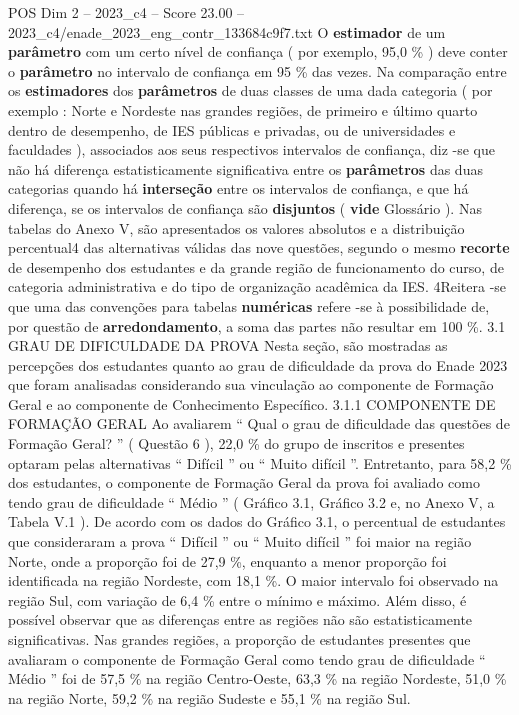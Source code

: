 \begin{textsample}{POS Dim 2 – 2023\_c4 – Score 23.00 – 2023\_c4/enade\_2023\_eng\_contr\_133684c9f7.txt}
O \textbf{estimador} de um \textbf{parâmetro} com um certo nível de confiança ( por exemplo, 95,0 \% ) deve conter o \textbf{parâmetro} no intervalo de confiança em 95 \% das vezes.
Na comparação entre os \textbf{estimadores} dos \textbf{parâmetros} de duas classes de uma dada categoria ( por exemplo : Norte e Nordeste nas grandes regiões, de primeiro e último quarto dentro de desempenho, de IES públicas e privadas, ou de universidades e faculdades ), associados aos seus respectivos intervalos de confiança, diz -se que não há diferença estatisticamente significativa entre os \textbf{parâmetros} das duas categorias quando há \textbf{interseção} entre os intervalos de confiança, e que há diferença, se os intervalos de confiança são \textbf{disjuntos} ( \textbf{vide} Glossário ).
Nas tabelas do Anexo V, são apresentados os valores absolutos e a distribuição percentual4 das alternativas válidas das nove questões, segundo o mesmo \textbf{recorte} de desempenho dos estudantes e da grande região de funcionamento do curso, de categoria administrativa e do tipo de organização acadêmica da IES. 4Reitera -se que uma das convenções para tabelas \textbf{numéricas} refere -se à possibilidade de, por questão de \textbf{arredondamento}, a soma das partes não resultar em 100 \%. 3.1 GRAU DE DIFICULDADE DA PROVA Nesta seção, são mostradas as percepções dos estudantes quanto ao grau de dificuldade da prova do Enade 2023 que foram analisadas considerando sua vinculação ao componente de Formação Geral e ao componente de Conhecimento Específico. 3.1.1 COMPONENTE DE FORMAÇÃO GERAL Ao avaliarem “ Qual o grau de dificuldade das questões de Formação Geral? ” ( Questão 6 ), 22,0 \% do grupo de inscritos e presentes optaram pelas alternativas “ Difícil ” ou “ Muito difícil ”.
Entretanto, para 58,2 \% dos estudantes, o componente de Formação Geral da prova foi avaliado como tendo grau de dificuldade “ Médio ” ( Gráfico 3.1, Gráfico 3.2 e, no Anexo V, a Tabela V.1 ).
De acordo com os dados do Gráfico 3.1, o percentual de estudantes que consideraram a prova “ Difícil ” ou “ Muito difícil ” foi maior na região Norte, onde a proporção foi de 27,9 \%, enquanto a menor proporção foi identificada na região Nordeste, com 18,1 \%.
O maior intervalo foi observado na região Sul, com variação de 6,4 \% entre o mínimo e máximo.
Além disso, é possível observar que as diferenças entre as regiões não são estatisticamente significativas.
Nas grandes regiões, a proporção de estudantes presentes que avaliaram o componente de Formação Geral como tendo grau de dificuldade “ Médio ” foi de 57,5 \% na região Centro-Oeste, 63,3 \% na região Nordeste, 51,0 \% na região Norte, 59,2 \% na região Sudeste e 55,1 \% na região Sul.

\end{textsample}
